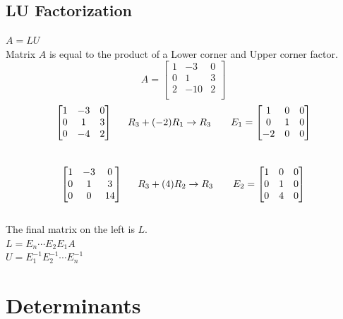 \documentclass[]{article}
\begin{document}
\subsection{LU Factorization}
$ A = LU $ \\
Matrix $A$ is equal to the product of a Lower corner and Upper corner factor. \\
$$ A =
\begin{bmatrix}
	1 & -3 & 0 \\
	0 &  1 & 3 \\
	2 & -10 & 2 \\
\end{bmatrix}
$$
	$$
	\begin{bmatrix}
		1 & -3 & 0 \\
		0 &  1 & 3 \\
		0 & -4 & 2 \\
	\end{bmatrix}
	\hspace{1.5em}
	R_3+(-2)R_1 \rightarrow R_3
	\hspace{2em} E_1 =
	\begin{bmatrix}
		 1 & 0 & 0 \\
		 0 & 1 & 0 \\
		-2 & 0 & 0 \\
	\end{bmatrix}
	$$\\
	$$
	\begin{bmatrix}
		1 & -3 & 0 \\
		0 &  1 & 3 \\
		0 &  0 & 14 \\
	\end{bmatrix}
	\hspace{1.5em}
	R_3+(4)R_2 \rightarrow R_3 
	\hspace{2em} E_2 =
	\begin{bmatrix}
		1 & 0 & 0 \\
		0 & 1 & 0 \\
		0 & 4 & 0 \\
	\end{bmatrix}
	$$\\
The final matrix on the left is $L$.\\
$ L = E_n \cdots E_2E_1A $ \\
$ U = E_1^{-1} E_2^{-1} \cdots E_n^{-1} $
\section{Determinants}
\end{document}
